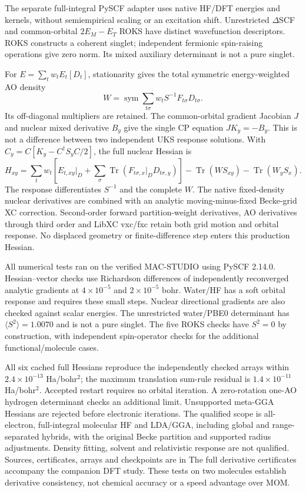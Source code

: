 \documentclass[11pt,a4paper]{article}
\begin{document}
\iffalse
The separate full-integral PySCF adapter uses native HF/DFT energies
and kernels, without semiempirical scaling or an excitation shift.
Unrestricted $\Delta$SCF and common-orbital $2E_M-E_T$ ROKS have distinct
wavefunction descriptors. ROKS constructs a coherent singlet;
independent fermionic spin-raising operations give zero norm.
Its mixed auxiliary determinant is not a pure singlet.

For $E=\sum_t w_tE_t[D_t]$, stationarity gives the total symmetric
energy-weighted AO density
\begin{equation}
 W=\operatorname{sym}\sum_{t\sigma}w_tS^{-1}F_{t\sigma}D_{t\sigma}.
\end{equation}
Its off-diagonal multipliers are retained. The common-orbital gradient
Jacobian $J$ and nuclear mixed derivative $B_y$ give the single CP
equation $JK_y=-B_y$. This is not a difference between two independent
UKS response solutions. With $C_y=C[K_y-C^\dagger S_yC/2]$, the full
nuclear Hessian is
\begin{equation}
 H_{xy}=\sum_t w_t\left[E_{t,xy}|_D+
 \sum_\sigma\operatorname{Tr}(F_{t\sigma,x}|_DD_{t\sigma,y})\right]
 -\operatorname{Tr}(WS_{xy})-\operatorname{Tr}(W_yS_x).
\end{equation}
The response differentiates $S^{-1}$ and the complete $W$. The native
fixed-density nuclear derivatives are combined with an analytic
moving-minus-fixed Becke-grid XC correction. Second-order forward
partition-weight derivatives, AO derivatives through third order and
LibXC vxc/fxc retain both grid motion and orbital response. No displaced
geometry or finite-difference step enters this production Hessian.



All numerical tests ran on the verified MAC-STUDIO using PySCF 2.14.0.
Hessian--vector checks use Richardson differences of independently
reconverged analytic gradients at $4\times10^{-5}$ and
$2\times10^{-5}$ bohr. Water/HF has a soft orbital response and requires
these small steps. Nuclear directional gradients are also checked
against scalar energies. The unrestricted water/PBE0 determinant has
$\langle S^2\rangle=1.0070$ and is not a pure singlet. The five ROKS
checks have $S^2=0$ by construction, with independent spin-operator
checks for the additional functional/molecule cases.

All six cached full Hessians reproduce the independently checked arrays
within $2.4\times10^{-13}$ Ha/bohr$^2$; the maximum translation sum-rule
residual is $1.4\times10^{-11}$ Ha/bohr$^2$. Accepted restart requires
no orbital iteration. A zero-rotation one-AO hydrogen determinant
checks an additional limit. Unsupported meta-GGA Hessians are rejected
before electronic iterations. The qualified scope is all-electron,
full-integral molecular HF and LDA/GGA, including global and
range-separated hybrids, with the original Becke partition and supported
radius adjustments. Density fitting, solvent and relativistic response
are not qualified. Sources, certificates, arrays and checkpoints are in
The full derivative certificates accompany the companion DFT study.
These tests on two molecules establish derivative consistency, not
chemical accuracy or a speed advantage over MOM.
\end{document}
